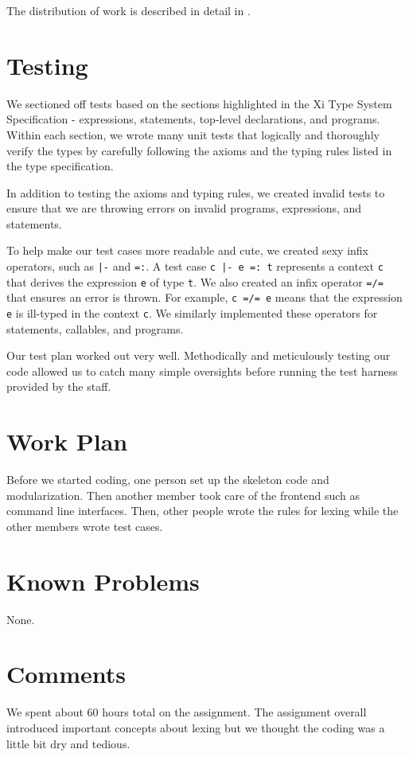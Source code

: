 \documentclass{hw}
\begin{document}
The distribution of work is described in detail in .

\section{Testing}\label{sec:testing}
We sectioned off tests based on the sections highlighted in the Xi Type System Specification - expressions, statements, top-level declarations, and programs. Within each section, we wrote many unit tests that logically and thoroughly verify the types by carefully following the axioms and the typing rules listed in the type specification.

In addition to testing the axioms and typing rules, we created invalid tests to ensure that we are throwing errors on invalid programs, expressions, and statements.

To help make our test cases more readable and cute, we created sexy infix operators, such as \texttt{|-} and \texttt{=:}. A test case \texttt{c |- e =: t} represents a context \texttt{c} that derives the expression \texttt{e} of type \texttt{t}. We also created an infix operator \texttt{=/=} that ensures an error is thrown. For example, \texttt{c =/= e} means that the expression \texttt{e} is ill-typed in the context \texttt{c}. We similarly implemented these operators for statements, callables, and programs.

Our test plan worked out very well. Methodically and meticulously testing our code allowed us to catch many simple oversights before running the test harness provided by the staff.

\section{Work Plan}\label{sec:workplan}
Before we started coding, one person set up the skeleton code and
modularization. Then another member took care of the frontend such as command
line interfaces. Then, other people wrote the rules for lexing while the other
members wrote test cases.

\section{Known Problems}\label{sec:problems}
None.

\section{Comments}\label{sec:comments}
We spent about 60 hours total on the assignment. The assignment overall
introduced important concepts about lexing but we thought the coding was a
little bit dry and tedious.
\end{document}
